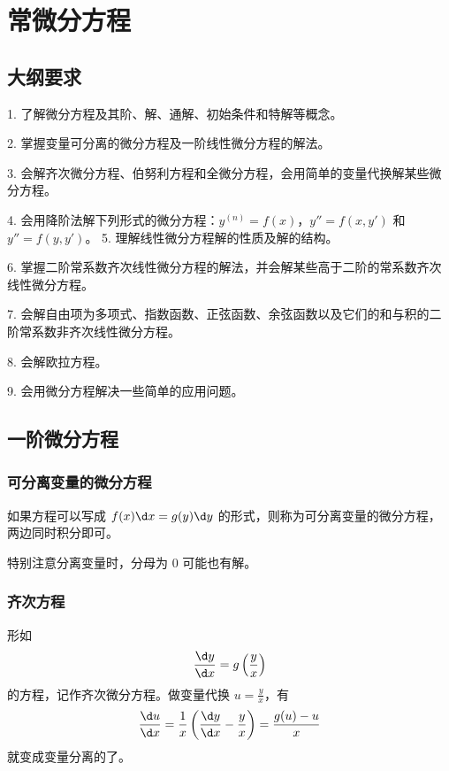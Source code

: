 \section{常微分方程}

\subsection{大纲要求}

1. 了解微分方程及其阶、解、通解、初始条件和特解等概念。

2. 掌握变量可分离的微分方程及一阶线性微分方程的解法。

3. 会解齐次微分方程、伯努利方程和全微分方程，会用简单的变量代换解某些微分方程。

4. 会用降阶法解下列形式的微分方程：$y^{(n)} = f(x)$，$y''= f(x,y')$ 和 $y''= f(y,y')$。
5. 理解线性微分方程解的性质及解的结构。

6. 掌握二阶常系数齐次线性微分方程的解法，并会解某些高于二阶的常系数齐次线性微分方程。

7. 会解自由项为多项式、指数函数、正弦函数、余弦函数以及它们的和与积的二阶常系数非齐次线性微分方程。

8. 会解欧拉方程。

9. 会用微分方程解决一些简单的应用问题。

\subsection{一阶微分方程}

\subsubsection*{可分离变量的微分方程}

如果方程可以写成 $f(x) \d x = g(y) \d y$ 的形式，则称为可分离变量的微分方程，两边同时积分即可。

\begin{note}
	特别注意分离变量时，分母为 $0$ 可能也有解。
\end{note}

\subsubsection*{齐次方程}

形如
\[ \frac{\d y}{\d x} = g\left(\frac{y}{x}\right) \]
的方程，记作齐次微分方程。做变量代换 $u = \frac{y}{x}$，有
\[ \frac{\d u}{\d x} = \frac{1}{x} \left(\frac{\d y}{\d x} -\frac{y}{x} \right) = \frac{g(u) - u}{x} \]
就变成变量分离的了。

